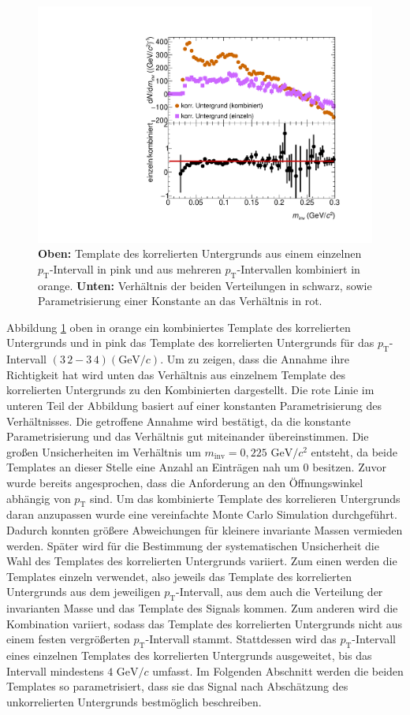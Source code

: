 \begin{figure}[tp]
\centering
\includegraphics[width=.7\linewidth]{BackgroundWithRatio10_Data_2016.pdf}
\caption{\textbf{Oben:} Template des korrelierten Untergrunds aus einem einzelnen $p_\text{T}$-Intervall in pink und aus mehreren $p_\text{T}$-Intervallen kombiniert in orange.
\textbf{Unten:} Verhältnis der beiden Verteilungen in schwarz, sowie Parametrisierung einer Konstante an das Verhältnis in rot.}
\label{fig:BkgTempRatio}
\end{figure}
\newline
Abbildung \ref{fig:BkgTempRatio} oben in orange ein kombiniertes Template des korrelierten Untergrunds und in pink das Template des korrelierten Untergrunds für das $p_\text{T}$-Intervall $(3\,2 - 3\,4) (\text{GeV/}c)$.
Um zu zeigen, dass die Annahme ihre Richtigkeit hat wird unten das Verhältnis aus einzelnem Template des korrelierten Untergrunds zu den Kombinierten dargestellt.
Die rote Linie im unteren Teil der Abbildung basiert auf einer konstanten Parametrisierung des Verhältnisses.
Die getroffene Annahme wird bestätigt, da die konstante Parametrisierung und das Verhältnis gut miteinander übereinstimmen.
Die großen Unsicherheiten im Verhältnis um $m_\text{inv} = 0,225\text{ GeV}/c^{2}$ entsteht, da beide Templates an dieser Stelle eine Anzahl an Einträgen nah um 0 besitzen.
\newline
Zuvor wurde bereits angesprochen, dass die Anforderung an den Öffnungswinkel abhängig von $p_\text{T}$ sind.
Um das kombinierte Template des korrelieren Untergrunds daran anzupassen wurde eine vereinfachte Monte Carlo Simulation durchgeführt.
Dadurch konnten größere Abweichungen für kleinere invariante Massen vermieden werden.
\newline
Später wird für die Bestimmung der systematischen Unsicherheit die Wahl des Templates des korrelierten Untergrunds variiert.
Zum einen werden die Templates einzeln verwendet, also jeweils das Template des korrelierten Untergrunds aus dem jeweiligen $p_\text{T}$-Intervall, aus dem auch die Verteilung der invarianten Masse und das Template des Signals kommen.
Zum anderen wird die Kombination variiert, sodass das Template des korrelierten Untergrunds nicht aus einem festen vergrößerten $p_\text{T}$-Intervall stammt.
Stattdessen wird das $p_\text{T}$-Intervall eines einzelnen Templates des korrelierten Untergrunds ausgeweitet, bis das Intervall mindestens $4\text{ GeV}/c$ umfasst.
\newline
Im Folgenden Abschnitt werden die beiden Templates so parametrisiert, dass sie das Signal nach Abschätzung des unkorrelierten Untergrunds bestmöglich beschreiben.